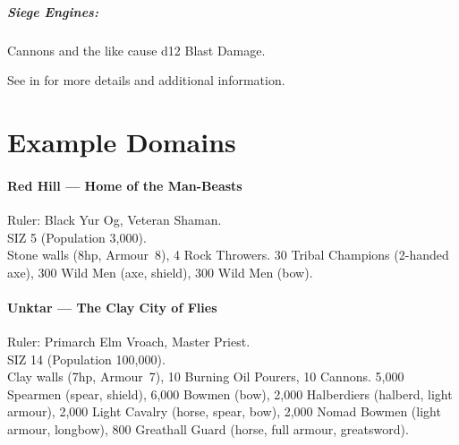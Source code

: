 \documentclass[itdr]{subfiles}
\begin{document}
\subparagraph{Siege Engines:} Cannons and the like cause d12 Blast Damage.

\begin{dbox}
	See \textbf{} in \textbf{} for more details and additional information.
\end{dbox}

\vfill

\section{Example Domains}

\paragraph{Red Hill --- Home of the Man-Beasts}
Ruler: Black Yur Og, Veteran Shaman.\\
SIZ 5 (Population 3,000).\\
Stone walls (8hp, Armour~8), 4 Rock Throwers. 30 Tribal Champions (2-handed axe), 300 Wild Men (axe, shield), 300 Wild Men (bow).

\paragraph{Unktar --- The Clay City of Flies}
Ruler: Primarch Elm Vroach, Master Priest.\\
SIZ 14 (Population 100,000).\\
Clay walls (7hp, Armour~7), 10 Burning Oil Pourers, 10 Cannons. 5,000 Spearmen (spear, shield), 6,000 Bowmen (bow), 2,000 Halberdiers (halberd, light armour), 2,000 Light Cavalry (horse, spear, bow), 2,000 Nomad Bowmen (light armour, longbow), 800 Greathall Guard (horse, full armour, greatsword).

\vfill
\end{document}
